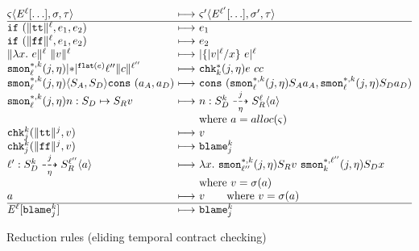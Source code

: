 \documentclass[preprint,onecolumn,9pt]{sigplanconf} %
\begin{document}
\begin{figure*}
  \centering
    $\begin{array}{@{}l @{\ }c@{\ } l@{}}
      \mstate \angle{\mctx{\mmlab}[\ldots], \msto, \mTMons}
      &\machstep&
      \mstate^\prime \angle{\mctx{\mmlab^\prime}[\ldots], \msto^\prime, \mTMons}
      \\ \hline
      \sif{ \sOwn{\strue}{\mmlab} }{\mexp_1}{\mexp_2}
      &\machstep&
      \mexp_1
      \\
      \sif{ \sOwn{\sfalse}{\mmlab} }{\mexp_1}{\mexp_2}
      &\machstep&
      \mexp_2
      \\
      \sapp{ \sOwn{\slam{\mvar}{\mexp}}{\mmlab} }{ \sOwn{\mval}{\mmlab} }
      &\machstep&
      \sown{ \sapp{\{ \sown{\mval}{\mmlab}/\mvar \}}{\mexp} }{\mmlab}
      \\
      \sSMon*{k}{\mmlab}{j}{\mtimeline}{ \sown*{\sflat{\mexp}}{\mmlab^{\prime\prime}} }{ \sOwn{\mconstant}{\mmlab^{\prime\prime}} }
      &\machstep&
      \schk*{k}{j}{\mtimeline}{ \sapp{\mexp}{\mconstant} }{\mconstant}
      \\ %
      \sSMon*{k}{\mmlab}{j}{\mtimeline}{\sconsc{\mscon_A}{\mscon_D}}{ \vcons{\maddr_A}{\maddr_D} }
      &\machstep&
      \vcons{ \sSMon*{k}{\mmlab}{j}{\mtimeline}{\mscon_A}{\maddr_A} }{ \sSMon*{k}{\mmlab}{j}{\mtimeline}{\mscon_D}{\maddr_D} }
      \\
      \sSMon*{k}{\mmlab}{j}{\mtimeline}{ \sarr{\mname}{\mscon_D}{\mscon_R} }{\mval}
      &\machstep&
      \bclos{\mname}{\mscon_D}{k}{j}{\mtimeline}{\mscon_R}{\mmlab}{\maddr} \\
      &&\text{where } \maddr = alloc(\mstate)
      \\
      \schk{k}{j}{ \sOwn{\strue}{j} }{\mval}
      &\machstep&
      \mval
      \\
      \schk{k}{j}{ \sOwn{\sfalse}{j} }{\mval}
      &\machstep&
      \sblame{k}{j}
      \\
      \bclos{\mmlab^\prime}{\mscon_D}{k}{j}{\mtimeline}{\mscon_R}{\mmlab^{\prime\prime}}{\maddr}
      &\machstep&
      \slam{\mvar}{ \sSMon*{k}{\mmlab^{\prime\prime}}{j}{\mtimeline}{\mscon_R}{%
      \sapp{\mval}{ \sSMon*{\mmlab^{\prime\prime}}{k}{j}{\mtimeline}{\mscon_D}{\mvar} } } } \\
      &&\text{where } \mval = \msto(\maddr)
      \\
      \maddr &\machstep& \mval \qquad\text{where } \mval = \msto(\maddr)
      \\ \hline
      \mctx{\mmlab}[\sblame{k}{j}]
      &\machstep&
      \sblame{k}{j}
    \end{array}$
  \caption{Reduction rules (eliding temporal contract checking)}
  \label{fig:standard}
\end{figure*}

\balance

%


% 
\end{document}
